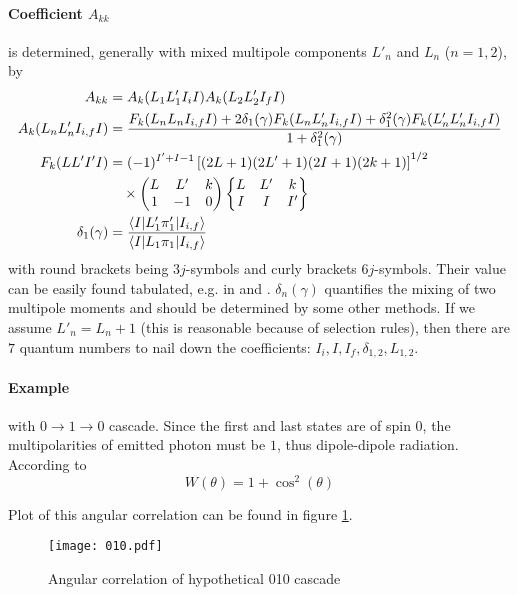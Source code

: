 \paragraph{Coefficient $A_{kk}$} is determined, generally with mixed multipole components $L'_n$ and $L_n$ ($n=1,2$), by
\begin{align}
   A_{kk} &= A_k(L_1 L_1' I_i I) A_k(L_2 L'_2 I_f I) \\
   A_k(L_n L'_n I_{i,f} I) &= \frac{F_k(L_n L_n I_{i,f} I) + 2 \delta_1(\gamma) F_k (L_n L'_n I_{i,f} I) + \delta_1^2(\gamma) F_{k}(L'_n L'_n I_{i,f} I)}{1 + \delta^2_1 (\gamma)} \\
   F_k(L L' I' I) &= (-1)^{I'+I-1} \left[ (2L + 1) (2L' + 1)(2I+1) (2k+1) \right]^{1/2} \notag \\
     & \quad \times \begin{pmatrix} L & L' & k \\ 1 & -1 & 0 \end{pmatrix} \begin{Bmatrix} L & L' & k \\ I & I & I'\end{Bmatrix} \\
   \delta_1 (\gamma) &= \frac{\braket{I | L'_1 \pi'_1 | I_{i,f}}}{ \braket{I | L_1 \pi_1 | I_{i,f}}}
\end{align}
with round brackets being $3j$-symbols and curly brackets $6j$-symbols\cite{siegbahn}. Their value can be easily found tabulated, e.g. in \cite{STEVENSON2002853} and \cite{369j}. $\delta_{n}(\gamma)$ quantifies the mixing of two multipole moments and should be determined by some other methods. If we assume $L'_n = L_n + 1$ (this is reasonable because of selection rules), then there are $7$ quantum numbers to nail down the coefficients: $I_i, I, I_f, \delta_{1,2}, L_{1,2}$\cite{siegbahn}.

\paragraph{Example} with $0 \rightarrow 1 \rightarrow 0$ \gag cascade. Since the first and last states are of spin $0$, the multipolarities of emitted photon must be $1$, thus dipole-dipole radiation. According to~\cite{deutsch}
\begin{equation}
   W(\theta) = 1 + \cos^{2}(\theta)
   \label{math:W010}
\end{equation}

Plot of this angular correlation can be found in figure \ref{W010}.
\begin{figure}[ht]
   \centering
   \texttt{[image: 010.pdf]}
   \caption{Angular correlation of hypothetical 010 cascade}%
   \label{W010}
\end{figure}

